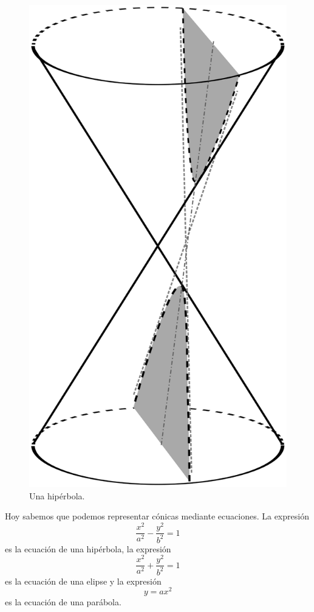 \begin{figure}[h]
   \centering
   \includegraphics[scale=0.04]{images/hiperbola}
   \caption{Una hipérbola.}
   \label{fig:hiperbola}
\end{figure}

Hoy sabemos que podemos representar cónicas mediante ecuaciones. La
expresión 
\[
	\frac{x^2}{a^2}-\frac{y^2}{b^2}=1
\]
es la ecuación de una hipérbola, la expresión 
\[
	\frac{x^2}{a^2}+\frac{y^2}{b^2}=1
\]
es la ecuación de una elipse y la expresión 
\[	
	y=ax^2
\]
es la ecuación de una parábola. 

